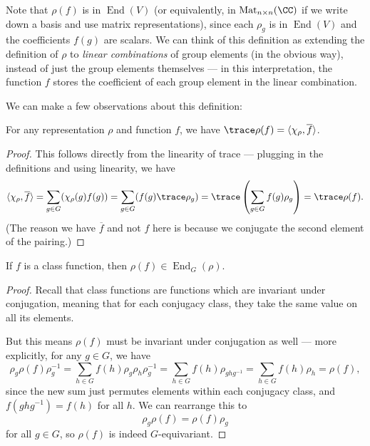 Note that $\rho(f)$ is in $\operatorname{End}(V)$ (or equivalently, in $\operatorname{Mat}_{n \times n}(\CC)$ if we write down a basis and use matrix representations), since each $\rho_g$ is in $\operatorname{End}(V)$ and the coefficients $f(g)$ are scalars. We can think of this definition as extending the definition of $\rho$ to \emph{linear combinations} of group elements (in the obvious way), instead of just the group elements themselves --- in this interpretation, the function $f$ stores the coefficient of each group element in the linear combination. 

We can make a few observations about this definition: 

\begin{lemma} \label{trace equals pairing}
For any representation $\rho$ and function $f$, we have $\trace \rho(f) = \langle \chi_\rho, \overline{f} \rangle$.
\end{lemma}

\begin{proof}
    This follows directly from the linearity of trace --- plugging in the definitions and using linearity, we have \[\langle \chi_\rho, \overline{f} \rangle = \sum_{g \in G} (\chi_\rho(g)f(g)) = \sum_{g \in G} (f(g)\trace \rho_g) = \trace \left(\sum_{g \in G} f(g)\rho_g\right) = \trace \rho(f).\] (The reason we have $\overline{f}$ and not $f$ here is because we conjugate the second element of the pairing.)
\end{proof}

\begin{lemma} \label{class functions equivariant}
    If $f$ is a class function, then $\rho(f) \in \operatorname{End}_G(\rho)$. 
\end{lemma}

\begin{proof}
    Recall that class functions are functions which are invariant under conjugation, meaning that for each conjugacy class, they take the same value on all its elements.
    
    But this means $\rho(f)$ must be invariant under conjugation as well --- more explicitly, for any $g \in G$, we have \[\rho_g\rho(f)\rho_g^{-1} = \sum_{h \in G} f(h)\rho_g\rho_h\rho_g^{-1} = \sum_{h \in G} f(h)\rho_{ghg^{-1}} = \sum_{h \in G} f(h)\rho_h = \rho(f),\] since the new sum just permutes elements within each conjugacy class, and $f(ghg^{-1}) = f(h)$ for all $h$. We can rearrange this to \[\rho_g\rho(f) = \rho(f)\rho_g\] for all $g \in G$, so $\rho(f)$ is indeed $G$-equivariant. 
\end{proof}

